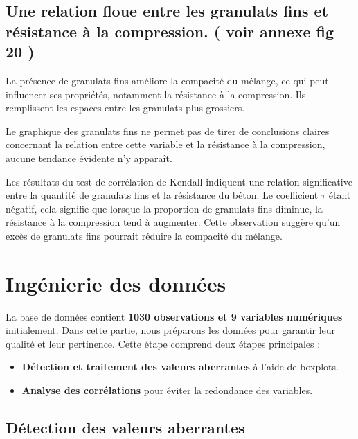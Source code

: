 \documentclass[
  12pt,
]{article}
\providecommand{\tightlist}{%
  \setlength{\itemsep}{0pt}\setlength{\parskip}{0pt}}
\begin{document}
\subsection{Une relation floue entre les granulats fins et résistance à
la compression. ( voir annexe fig 20
)}\label{une-relation-floue-entre-les-granulats-fins-et-ruxe9sistance-uxe0-la-compression.-voir-annexe-fig-20}

La présence de granulats fins améliore la compacité du mélange, ce qui
peut influencer ses propriétés, notamment la résistance à la
compression. Ils remplissent les espaces entre les granulats plus
grossiers.

Le graphique des granulats fins ne permet pas de tirer de conclusions
claires concernant la relation entre cette variable et la résistance à
la compression, aucune tendance évidente n'y apparaît.

Les résultats du test de corrélation de Kendall indiquent une relation
significative entre la quantité de granulats fins et la résistance du
béton. Le coefficient \(\tau\) étant négatif, cela signifie que lorsque
la proportion de granulats fins diminue, la résistance à la compression
tend à augmenter. Cette observation suggère qu'un excès de granulats
fins pourrait réduire la compacité du mélange.

\section{Ingénierie des données}\label{inguxe9nierie-des-donnuxe9es}

La base de données contient \textbf{1030 observations et 9 variables
numériques} initialement. Dans cette partie, nous préparons les données
pour garantir leur qualité et leur pertinence. Cette étape comprend deux
étapes principales :

\begin{itemize}
\tightlist
\item
  \textbf{Détection et traitement des valeurs aberrantes} à l'aide de
  boxplots.\\
\item
  \textbf{Analyse des corrélations} pour éviter la redondance des
  variables.
\end{itemize}

\subsection{Détection des valeurs
aberrantes}\label{duxe9tection-des-valeurs-aberrantes}
\end{document}

